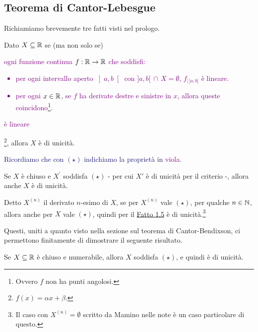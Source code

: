 \pagebreak
\subsection{Teorema di Cantor-Lebesgue}

Richiamiamo brevemente tre fatti visti nel prologo.

\begin{fact}
\label{unicit\`a}
Dato $X \subseteq \mathbb R$ se (ma non solo se) \textcolor{purple}{ogni funzione continua $f : \mathbb R \to \mathbb R$ che soddisfi:
\begin{itemize}
	\item per ogni intervallo aperto $\left]a,b\right[$ con $]a,b[ \,\cap\, X = \emptyset$, $f_{| \, ]a,b[}$ \`e lineare.
	\item per ogni $x \in \mathbb R$, se $f$ ha derivate destre e sinistre in $x$, allora queste coincidono\footnote{Ovvero $f$ non ha punti angolosi.}.
\end{itemize}
\`e lineare}\footnote{$f(x) = \alpha x + \beta$.}, allora $X$ \`e di unicit\`a.
\end{fact}

\textcolor{MidnightBlue}{Ricordiamo che con $(\star)$ indichiamo la propriet\`a in \textcolor{purple}{viola}.}

\begin{remark}
	Se $X$ \`e chiuso e $X^{\prime}$ soddisfa $(\star)$ - per cui $X'$ \`e di unicit\`a per il criterio -, allora anche $X$ \`e di unicit\`a.
\end{remark}

\begin{corollary}
Detto $X^{(n)}$ il derivato $n$-esimo di $X$, se per $X^{(n)}$ vale $(\star)$, per qualche $n \in \mathbb N$, allora anche per $X$ vale $(\star)$, quindi per il \hyperref[unicit\`a]{Fatto 1.5} \`e di unicit\`a.\footnote{Il caso con $X^{(n)} = \emptyset$ scritto da Mamino nelle note \`e un caso particolare di questo.}
\end{corollary}

Questi, uniti a quanto visto nella sezione sul teorema di Cantor-Bendixson, ci permettono finitamente di dimostrare il seguente risultato.

\begin{theorem}
	Se $X \subseteq \mathbb R$ \`e chiuso e numerabile, allora $X$ soddisfa $(\star)$, e quindi \`e di unicit\`a.
\end{theorem}

